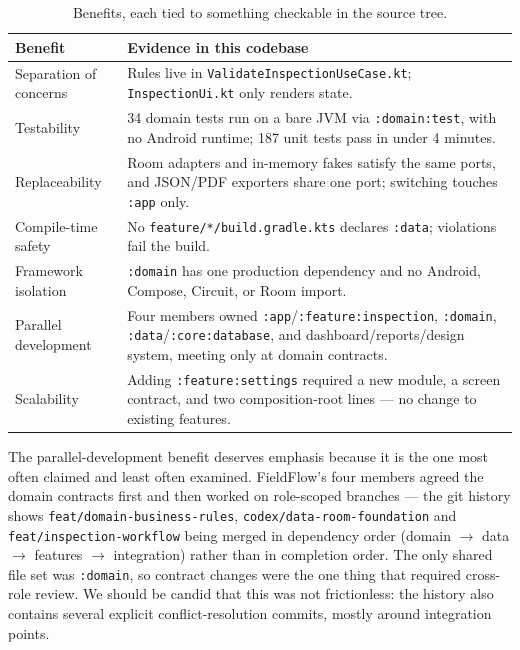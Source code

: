 \documentclass[11pt,a4paper]{article}
\newcommand{\mdl}[1]{\texttt{#1}}
\newcommand{\file}[1]{{\small\texttt{#1}}}
\begin{document}
\begin{table}[H]
\centering
\small
\begin{tabularx}{\linewidth}{@{}p{3.5cm} X@{}}
\toprule
\textbf{Benefit} & \textbf{Evidence in this codebase} \\
\midrule
Separation of concerns & Rules live in \file{ValidateInspectionUseCase.kt}; \file{InspectionUi.kt} only renders state. \\
Testability            & 34 domain tests run on a bare JVM via \texttt{:domain:test}, with no Android runtime; 187 unit tests pass in under 4 minutes. \\
Replaceability         & Room adapters and in-memory fakes satisfy the same ports, and JSON/PDF exporters share one port; switching touches \mdl{:app} only. \\
Compile-time safety    & No \file{feature/*/build.gradle.kts} declares \mdl{:data}; violations fail the build. \\
Framework isolation    & \mdl{:domain} has one production dependency and no Android, Compose, Circuit, or Room import. \\
Parallel development   & Four members owned \mdl{:app}/\mdl{:feature:inspection}, \mdl{:domain}, \mdl{:data}/\mdl{:core:database}, and dashboard/reports/design system, meeting only at domain contracts. \\
Scalability            & Adding \mdl{:feature:settings} required a new module, a screen contract, and two composition-root lines --- no change to existing features. \\
\bottomrule
\end{tabularx}
\caption{Benefits, each tied to something checkable in the source tree.}
\end{table}

The parallel-development benefit deserves emphasis because it is the one most
often claimed and least often examined. FieldFlow's four members agreed the
domain contracts first and then worked on role-scoped branches --- the git
history shows \texttt{feat/domain-business-rules},
\texttt{codex/data-room-foundation} and \texttt{feat/inspection-workflow} being
merged in dependency order (domain $\rightarrow$ data $\rightarrow$ features
$\rightarrow$ integration) rather than in completion order. The only shared file
set was \mdl{:domain}, so contract changes were the one thing that required
cross-role review. We should be candid that this was not frictionless: the
history also contains several explicit conflict-resolution commits, mostly
around integration points.
\end{document}
